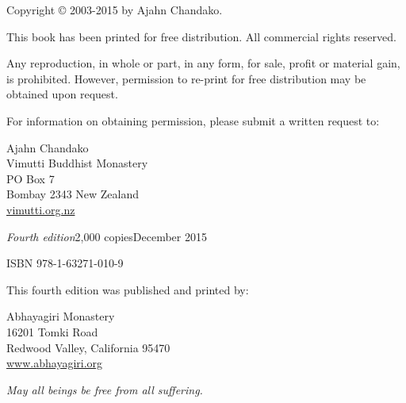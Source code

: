 Copyright © 2003-2015 by Ajahn Chandako.

This book has been printed for free distribution. All commercial rights
reserved.

Any reproduction, in whole or part, in any form, for sale, profit or material
gain, is prohibited. However, permission to re-print for free distribution may
be obtained upon request.

For information on obtaining permission, please submit a written request to:

\begin{copyrightindent}
  Ajahn Chandako\\
  Vimutti Buddhist Monastery\\
  PO Box 7\\
  Bombay 2343 New Zealand\\
  \href{http://vimutti.org.nz/}{vimutti.org.nz}
\end{copyrightindent}

\textit{Fourth edition}\hspace*{0.5em}2,000 copies\hspace*{0.5em}December 2015

ISBN 978-1-63271-010-9

This fourth edition was published and printed by:

\begin{copyrightindent}
  Abhayagiri Monastery\\
  16201 Tomki Road\\
  Redwood Valley, California 95470\\
  \href{http://www.abhayagiri.org/}{www.abhayagiri.org}
\end{copyrightindent}

\textit{May all beings be free from all suffering.}

